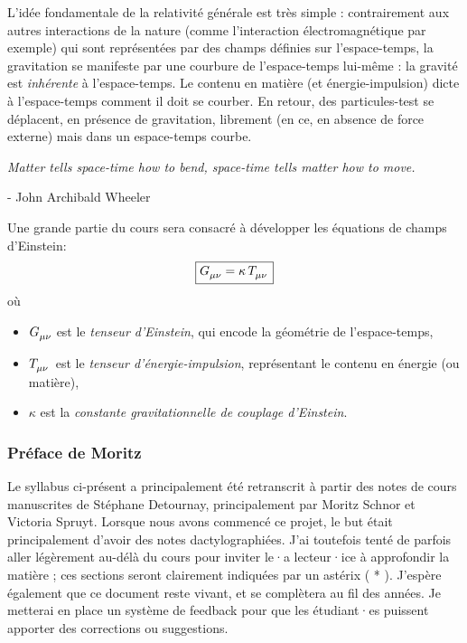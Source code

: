 L'idée fondamentale de la relativité générale est très simple : contrairement aux autres interactions de la nature (comme l'interaction électromagnétique par exemple) qui sont représentées par des champs définies sur l'espace-temps, la gravitation se manifeste par une courbure de l'espace-temps lui-même : la gravité est \emph{inhérente} à l'espace-temps. Le contenu en matière (et énergie-impulsion) dicte à l'espace-temps comment il doit se courber. En retour, des particules-test se déplacent, en présence de gravitation, librement (en ce, en absence de force externe) mais dans un espace-temps courbe. 
\begin{center}
    \textit{Matter tells space-time how to bend, space-time tells matter how to move.}
\end{center}
\begin{flushright}
    - John Archibald Wheeler
\end{flushright}

Une grande partie du cours sera consacré à développer les équations de champs d'Einstein: 
\begin{align}
    \label{eq:Einstein introduction}
    \boxed{G\indices{_\mu_\nu} = \kappa \, T\indices{_\mu _\nu}}
\end{align}
où 
\begin{itemize}
    \item $G\indices{_\mu _\nu}$ est le \emph{tenseur d'Einstein}, qui encode la géométrie de l'espace-temps,
    \item  $T\indices{_\mu _\nu}$ est le \emph{tenseur d'énergie-impulsion}, représentant le contenu en énergie (ou matière),
    \item $\kappa$ est la \emph{constante gravitationnelle de couplage d'Einstein}.
\end{itemize}
\cutebreak

\subsubsection{Préface de Moritz}
Le syllabus ci-présent a principalement été retranscrit à partir des notes de cours manuscrites de Stéphane Detournay, principalement par Moritz Schnor et Victoria Spruyt. Lorsque nous avons commencé ce projet, le but était principalement d'avoir des notes dactylographiées. J'ai toutefois tenté de parfois aller légèrement au-délà du cours pour inviter le·a lecteur·ice à approfondir la matière ; ces sections seront clairement indiquées par un astérix ( * ). J'espère également que ce document reste vivant, et se complètera au fil des années. Je metterai en place un système de feedback pour que les étudiant·es puissent apporter des corrections ou suggestions. 

